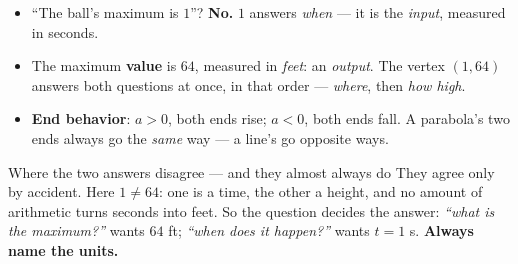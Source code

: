 \documentclass[aspectratio=169, 11pt]{beamer}
\begin{document}
\begin{frame}[t, plain]
  \begin{itemize}\setlength{\itemsep}{4pt}
    \item ``The ball's maximum is $1$''? \textbf{No.} $1$ answers \emph{when} --- it is the
          \emph{input}, measured in seconds.
    \item The maximum \textbf{value} is $64$, measured in \emph{feet}: an \emph{output}. The
          vertex $(1,64)$ answers both questions at once, in that order --- \emph{where}, then
          \emph{how high}.
    \item \textbf{End behavior}: $a>0$, both ends rise; $a<0$, both ends fall. A parabola's two
          ends always go the \emph{same} way --- a line's go opposite ways.
  \end{itemize}
  \vspace{3pt}
  \begin{block}{Where the two answers disagree --- and they almost always do}
    They agree only by accident. Here $1\ne64$: one is a time, the other a height, and no amount
    of arithmetic turns seconds into feet. So the question decides the answer: \emph{``what is the
    maximum?''} wants $64$ ft; \emph{``when does it happen?''} wants $t=1$ s. \textbf{Always name
    the units.}
  \end{block}
\end{frame}
\end{document}
